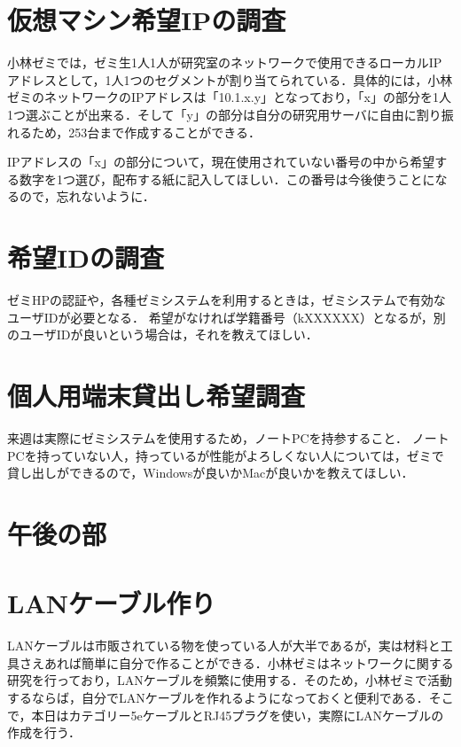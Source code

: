 \documentclass[11pt]{jarticle}
\begin{document}
\section{仮想マシン希望IPの調査}

小林ゼミでは，ゼミ生1人1人が研究室のネットワークで使用できるローカルIPアドレスとして，1人1つのセグメントが割り当てられている．具体的には，小林ゼミのネットワークのIPアドレスは「10.1.x.y」となっており，「x」の部分を1人1つ選ぶことが出来る．そして「y」の部分は自分の研究用サーバに自由に割り振れるため，253台まで作成することができる．

IPアドレスの「x」の部分について，現在使用されていない番号の中から希望する数字を1つ選び，配布する紙に記入してほしい．この番号は今後使うことになるので，忘れないように．

\section{希望IDの調査}

ゼミHPの認証や，各種ゼミシステムを利用するときは，ゼミシステムで有効なユーザIDが必要となる．
希望がなければ学籍番号（kXXXXXX）となるが，別のユーザIDが良いという場合は，それを教えてほしい．

\section{個人用端末貸出し希望調査}

来週は実際にゼミシステムを使用するため，ノートPCを持参すること．
ノートPCを持っていない人，持っているが性能がよろしくない人については，ゼミで貸し出しができるので，Windowsが良いかMacが良いかを教えてほしい．


\section*{午後の部}

\section{LANケーブル作り}

LANケーブルは市販されている物を使っている人が大半であるが，実は材料と工具さえあれば簡単に自分で作ることができる．小林ゼミはネットワークに関する研究を行っており，LANケーブルを頻繁に使用する．そのため，小林ゼミで活動するならば，自分でLANケーブルを作れるようになっておくと便利である．そこで，本日はカテゴリー5eケーブルとRJ45プラグを使い，実際にLANケーブルの作成を行う．
\end{document}
